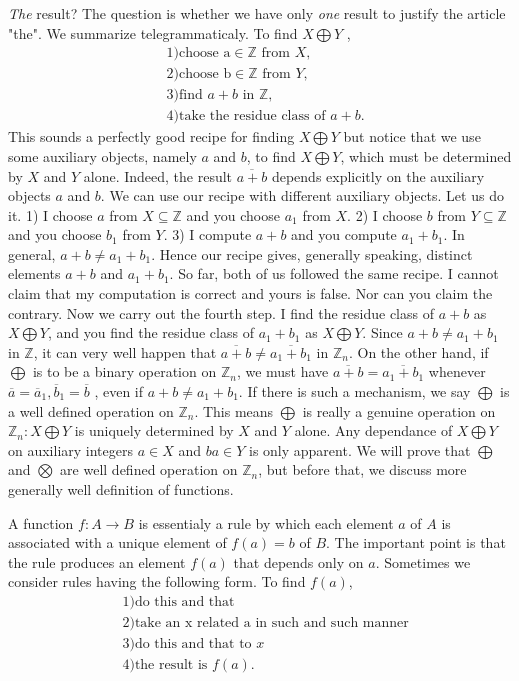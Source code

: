 \documentclass[12pt]{article}
\begin{document}
\noindent \textit{The} result? The question is whether we have only \textit{one} result to justify the article "the". We summarize telegrammaticaly. To find $ X  \bigoplus  Y $ ,
	\begin{align*}
		&1) \text{choose a} \in \mathds{Z}  \text{ from } X, \\
		&2) \text{choose b} \in \mathds{Z}  \text{ from } Y, \\
		&3) \text{find } a + b \text{ in }  \mathds{Z} , \\
		&4) \text{take the residue class of } a + b.
	\end{align*}
\noindent This sounds a perfectly good recipe for finding $X \bigoplus Y$ but notice that we use some auxiliary objects, namely $a$ and $b$, to find $X \bigoplus Y$, which must be determined by $X$ and $Y$ alone. Indeed, the result $ \overline{a + b} $ depends explicitly on the auxiliary objects $a$ and $b$. We can use our recipe with different auxiliary objects. Let us do it. 1) I choose $a$ from $X \subseteq \mathds{Z} $ and you choose $a_{1}$ from $X$. 2) I choose $b$ from $Y  \subseteq \mathds{Z} $ and you choose $b_{1}$ from $Y$. 3) I compute $a + b$ and you compute $ a_{1} + b_{1} $. In general, $a + b \neq a_{1} + b_{1} $. Hence our recipe gives, generally speaking, distinct elements $ a + b $ and $ a_{1} + b_{1} $. So far, both of us followed the same recipe. I cannot claim that my computation is correct and yours is false. Nor can you claim the contrary. Now we carry out the fourth step. I find the residue class of $ a + b $ as  $ X \bigoplus  Y $, and you find the residue class of $ a_{1} + b_{1} $ as  $ X \bigoplus  Y $. Since $a + b \neq a_{1} + b_{1} $ in $\mathds{Z} $, it can very well happen that $ \overline{a + b} \neq  \overline{a_{1} + b_{1}} $ in $ \mathds{Z}_{n} $. On the other hand, if $ \bigoplus $ is to be a binary operation on  $ \mathds{Z}_{n} $, we must have $ \overline{a + b} = \overline{a_{1} + b_{1}} $ whenever $ \overline{a} =  \overline{a}_{1} ,  \overline{b}_{1} =  \overline{b} $ , even if $ a + b \neq a_{1} + b_{1} $. If there is such a mechanism, we say $ \bigoplus $ is a well defined operation on $ \mathds{Z}_{n} $. This means $ \bigoplus $ is really a genuine operation on $ \mathds{Z}_{n} : X \bigoplus  Y $ is uniquely determined by $X$ and $Y$ alone. Any dependance of $X \bigoplus  Y $  on auxiliary integers $ a \in X $ and $ b a \in Y $ is only apparent. We will prove that $\bigoplus$ and $\bigotimes$ are well defined operation on $ \mathds{Z}_{n} $, but before that, we discuss more generally well definition of functions.

\noindent A function $f: A \rightarrow B$ is essentialy a rule by which each element $a$ of $A$ is associated with a unique element of $f(a) = b$ of $B$. The important point is that the rule produces an element $f(a)$ that depends only on $a$. Sometimes we consider rules having the following form. To find $f(a)$,
	\begin{align*}
		&1) \text{do this and that} \\
		&2) \text{take an x related a in such and such manner} \\
		&3) \text{do this and that to } x \\
		&4) \text{the result is } f(a).
	\end{align*}
\end{document}
